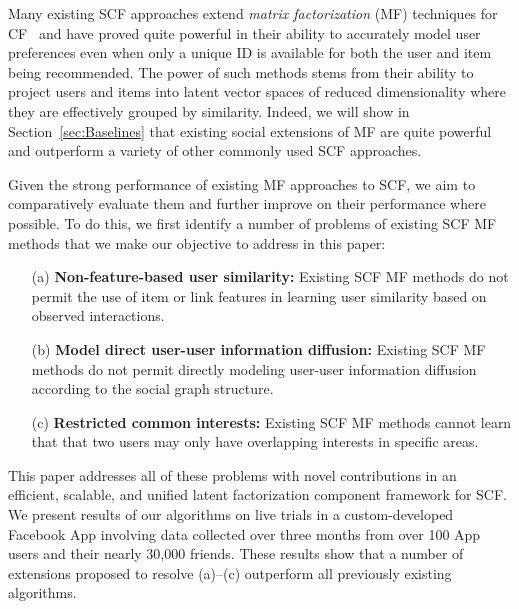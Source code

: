 \documentclass{sig-alternate}
\begin{document}
Many existing SCF approaches extend \emph{matrix factorization} (MF)
techniques for CF~\cite{pmf} and have proved quite powerful in their ability to
accurately model user preferences even when only a unique ID is
available for both the user and item being recommended.  The power of
such methods stems from their ability to project users and items into
latent vector spaces of reduced dimensionality where they are 
effectively grouped by similarity.  Indeed, we will show in
Section~\ref{sec:Baselines} that existing social extensions of MF are
quite powerful and outperform a variety of other commonly used SCF
approaches.

Given the strong performance of existing MF approaches to SCF, we aim
to comparatively evaluate them and further improve on their
performance where possible.  To do this, we first identify a number of
problems of existing SCF MF methods that we make our objective to
address in this paper:
\begin{enumerate}
\item[(a)] {\bf Non-feature-based user similarity:} Existing SCF MF
methods do not permit the use of item or link features in learning
user similarity based on observed interactions.
\item[(b)] {\bf Model direct user-user information diffusion:}
Existing SCF MF methods do not permit directly modeling user-user
information diffusion according to the social graph structure.
\item[(c)] {\bf Restricted common interests:} Existing SCF MF methods
cannot learn that that two users may only have overlapping interests
in specific areas.
\end{enumerate}

This paper addresses all of these problems with novel contributions in
an efficient, scalable, and unified latent factorization component
framework for SCF.  We present results of our algorithms on live
trials in a custom-developed Facebook App involving data collected
over three months from over 100 App users and their nearly 30,000
friends.  These results show that a number of extensions proposed to
resolve (a)--(c) outperform all previously existing algorithms.
\end{document}
